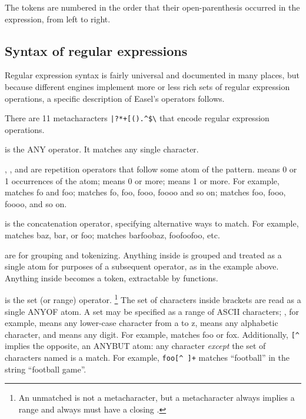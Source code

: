 The tokens are numbered in the order that their open-parenthesis
occurred in the expression, from left to right.


\subsection{Syntax of regular expressions}

Regular expression syntax is fairly universal and documented in many
places, but because different engines implement more or less rich sets
of regular expression operations, a specific description of Easel's
operators follows.

There are 11 metacharacters \verb'|?*+[().^$\' that encode regular
expression operations.

 is the ANY operator. It matches any single character.

, \ccode{*}, and \ccode{+} are repetition operators that
follow some atom of the pattern.  means 0 or 1 occurrences of
the atom; \ccode{*} means 0 or more; \ccode{+} means 1 or more.  For
example,  matches fo and foo;  matches fo,
foo, fooo, foooo and so on;  matches foo, fooo, foooo, and
so on.

\ccode{|} is the concatenation operator, specifying alternative ways
to match. For example,  matches baz, bar, or foo;
 matches barfoobaz, foofoofoo, etc.

\ccode{()} are for grouping and tokenizing. Anything inside \ccode{()}
is grouped and treated as a single atom for purposes of a subsequent
 operator, as in the  example above.
Anything inside \ccode{()} becomes a token, extractable by
 functions.

\ccode{[} is the set (or range) operator. \footnote{An unmatched
\ccode{]} is not a metacharacter, but a \ccode{[} metacharacter always
implies a range and always must have a closing \ccode{]}.} The set of
characters inside brackets \ccode{[]} are read as a single ANYOF
atom. A set may be specified as a range of ASCII characters;
\ccode{[a-z]}, for example, means any lower-case character from a to
z, \ccode{[a-zA-Z]} means any alphabetic character, and \ccode{[0-9]}
means any digit. For example,  matches foo or
fox. Additionally, \verb+[^+ implies the opposite, an ANYBUT atom:
any character \emph{except} the set of characters named is a
match. For example, \verb'foo[^ ]+' matches ``football'' in the
string ``football game''.

